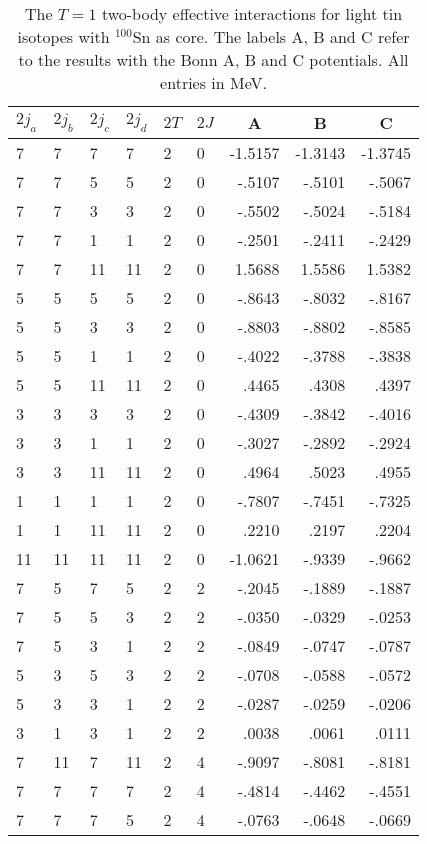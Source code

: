 \begin{table}[hbtp]
\caption{The $T=1$ two-body effective interactions for light 
tin isotopes with $^{100}$Sn as core.
The labels A, B and C refer to the results with the Bonn A, B and
C potentials.
All entries in MeV.}
\small
\begin{center}
\begin{tabular}{llllllrrr}
\hline
$2j_{a}$&$2j_{b}$&$2j_{c}$&$2j_{d}$&$2T$&$2J$&
\multicolumn{1}{c}{A}&
\multicolumn{1}{c}{B}&
\multicolumn{1}{c}{C}
\\\hline
  7& 7& 7& 7& 2& 0& -1.5157& -1.3143& -1.3745\\
  7& 7& 5& 5& 2& 0&  -.5107&  -.5101&  -.5067\\
  7& 7& 3& 3& 2& 0&  -.5502&  -.5024&  -.5184\\
  7& 7& 1& 1& 2& 0&  -.2501&  -.2411&  -.2429\\
  7& 7&11&11& 2& 0&  1.5688&  1.5586&  1.5382\\
  5& 5& 5& 5& 2& 0&  -.8643&  -.8032&  -.8167\\
  5& 5& 3& 3& 2& 0&  -.8803&  -.8802&  -.8585\\
  5& 5& 1& 1& 2& 0&  -.4022&  -.3788&  -.3838\\
  5& 5&11&11& 2& 0&   .4465&   .4308&   .4397\\
  3& 3& 3& 3& 2& 0&  -.4309&  -.3842&  -.4016\\
  3& 3& 1& 1& 2& 0&  -.3027&  -.2892&  -.2924\\
  3& 3&11&11& 2& 0&   .4964&   .5023&   .4955\\
  1& 1& 1& 1& 2& 0&  -.7807&  -.7451&  -.7325\\
  1& 1&11&11& 2& 0&   .2210&   .2197&   .2204\\
 11&11&11&11& 2& 0& -1.0621&  -.9339&  -.9662\\
  7& 5& 7& 5& 2& 2&  -.2045&  -.1889&  -.1887\\
  7& 5& 5& 3& 2& 2&  -.0350&  -.0329&  -.0253\\
  7& 5& 3& 1& 2& 2&  -.0849&  -.0747&  -.0787\\
  5& 3& 5& 3& 2& 2&  -.0708&  -.0588&  -.0572\\
  5& 3& 3& 1& 2& 2&  -.0287&  -.0259&  -.0206\\
  3& 1& 3& 1& 2& 2&   .0038&   .0061&   .0111\\
  7&11& 7&11& 2& 4&  -.9097&  -.8081&  -.8181\\
  7& 7& 7& 7& 2& 4&  -.4814&  -.4462&  -.4551\\
  7& 7& 7& 5& 2& 4&  -.0763&  -.0648&  -.0669\\
\hline
\end{tabular}
\end{center}
\label{tab:tins}
\end{table}
